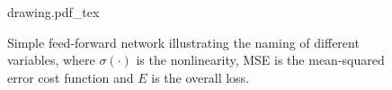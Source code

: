 \begin{figure}[bh!]
\centering
\newcommand{\repSigmoid}{$\sigma(\cdot)$}
\newcommand{\repLinear}{$\sum$}
\newcommand{\repMse}{MSE}
\newcommand{\repFirstSum}{$\Input j 1$}
\newcommand{\repLastSum}{$\Input i 0$}
\newcommand{\repFirstOutput}{\hspace{1.5cm}$\Con j i 0 \!=\! \Weight j i 0 \Out j 1$}
\newcommand{\repLastOutput}{$\Out i 0$}
\newcommand{\repLoss}{$E$}
\def\svgwidth{0.9\textwidth}
\hspace{-2cm}
{drawing.pdf_tex}
\hspace{-2cm}
\caption{Simple feed-forward network illustrating the naming of different variables, where $\sigma(\cdot)$ is the nonlinearity, MSE is the mean-squared error cost function and $E$ is the overall loss.}
\end{figure}